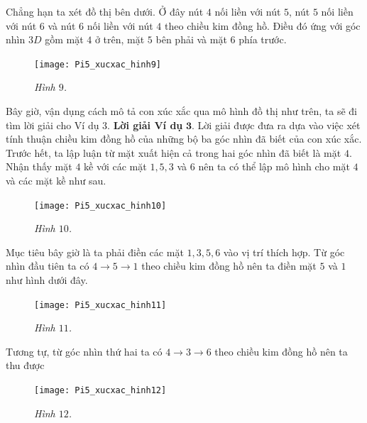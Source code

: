 \begin{multicols}{2}
	\vskip 0.1cm
	Chẳng hạn ta xét đồ thị bên dưới. Ở đây nút $4$ nối liền với nút $5$, nút $5$ nối liền với nút $6$ và nút $6$ nối liền với nút $4$ theo chiều kim đồng hồ. Điều đó ứng với góc nhìn $3D$ gồm mặt $4$ ở trên, mặt $5$ bên phải và mặt $6$ phía trước.    
	\begin{figure}[H]
		\vspace*{-5pt}
		\centering
		\captionsetup{labelformat= empty, justification=centering}
		\texttt{[image: Pi5\_xucxac\_hinh9]}
		\caption{\small\textit{\color{toancuabi}Hình $9$.}}
		\vspace*{-10pt}
	\end{figure}
	Bây giờ, vận dụng cách mô tả con xúc xắc qua mô hình đồ thị như trên, ta sẽ đi tìm lời giải cho Ví dụ $3$.
	\vskip 0.1cm
	\textbf{\color{toancuabi}Lời giải Ví dụ} $\pmb{3.}$
	\vskip 0.1cm
	Lời giải được đưa ra dựa vào việc xét tính thuận chiều kim đồng hồ của những bộ ba góc nhìn đã biết của con xúc xắc.
	\vskip 0.1cm
	Trước hết, ta lập luận từ mặt xuất hiện cả trong hai góc nhìn đã biết là mặt $4$. Nhận thấy mặt $4$ kề với các mặt $1, 5, 3$ và $6$ nên ta có thể lập mô hình cho mặt $4$ và các mặt kề như sau. 
	\begin{figure}[H]
		\vspace*{-5pt}
		\centering
		\captionsetup{labelformat= empty, justification=centering}
		\texttt{[image: Pi5\_xucxac\_hinh10]}
		\caption{\small\textit{\color{toancuabi}Hình $10$.}}
		\vspace*{-10pt}
	\end{figure}
	Mục tiêu bây giờ là ta phải điền các mặt $1, 3, 5, 6$ vào vị trí thích hợp.
	\vskip 0.1cm
	Từ góc nhìn đầu tiên ta có $4\to 5 \to 1$ theo chiều kim đồng hồ nên ta điền mặt $5$ và $1$ như hình dưới đây.
	\begin{figure}[H]
		\vspace*{-5pt}
		\centering
		\captionsetup{labelformat= empty, justification=centering}
		\texttt{[image: Pi5\_xucxac\_hinh11]}
		\caption{\small\textit{\color{toancuabi}Hình $11$.}}
		\vspace*{-10pt}
	\end{figure}
	Tương tự, từ góc nhìn thứ hai ta có $4 \to 3 \to 6$ theo chiều kim đồng hồ nên ta thu được 
	\begin{figure}[H]
		\vspace*{-5pt}
		\centering
		\captionsetup{labelformat= empty, justification=centering}
		\texttt{[image: Pi5\_xucxac\_hinh12]}
		\caption{\small\textit{\color{toancuabi}Hình $12$.}}
		\vspace*{-10pt}

\end{figure}
\end{multicols}
